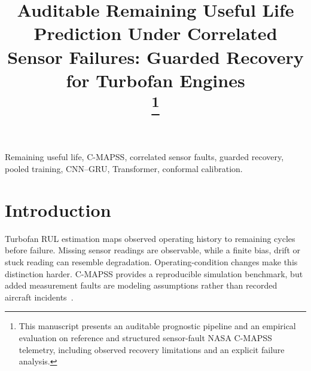\documentclass[conference]{IEEEtran}
\begin{document}
\title{Auditable Remaining Useful Life Prediction Under Correlated Sensor Failures: Guarded Recovery for Turbofan Engines\\
\thanks{This manuscript presents an auditable prognostic pipeline and an empirical evaluation on reference and structured sensor-fault NASA C-MAPSS telemetry, including observed recovery limitations and an explicit failure analysis.}
}

\author{
\and
{}
\and
{}
}

\maketitle

\begin{abstract}

\end{abstract}
\begin{IEEEkeywords}
Remaining useful life, C-MAPSS, correlated sensor faults, guarded recovery, pooled training, CNN--GRU, Transformer, conformal calibration.
\end{IEEEkeywords}

\raggedbottom

\section{\textbf{Introduction}}
Turbofan RUL estimation maps observed operating history to remaining cycles before
failure. Missing sensor readings are observable, while a finite bias, drift or
stuck reading can resemble degradation. Operating-condition changes make this
distinction harder. C-MAPSS provides a reproducible simulation benchmark, but
added measurement faults are modeling assumptions rather than recorded aircraft
incidents~\cite{saxena2008damage}.
\end{document}
